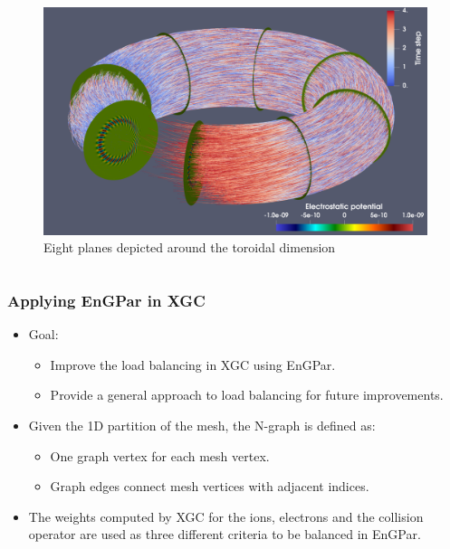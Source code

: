 \documentclass[aspectratio=169]{beamer}
\begin{document}
\begin{frame}
\begin{columns}
\begin{column}{.3\textwidth}
      \begin{figure}
        \centering
        \includegraphics[height=.3\textheight]{cyclone_590k_30kptcls.png}
        \caption*{Eight planes depicted around the toroidal dimension}
      \end{figure}
    \end{column}
  \end{columns}
\end{frame}

\begin{frame}
  \frametitle{Applying EnGPar in XGC}
  \begin{itemize}
  \item Goal:
    \begin{itemize}
    \item Improve the load balancing in XGC using EnGPar.
    \item Provide a general approach to load balancing for future improvements.
    \end{itemize}
  \item Given the 1D partition of the mesh, the N-graph is defined as:
    \begin{itemize}
    \item One graph vertex for each mesh vertex.
    \item Graph edges connect mesh vertices with adjacent indices.
    \end{itemize}
  \item The weights computed by XGC for the ions, electrons and the collision operator are used as three different criteria to be balanced in EnGPar.
  \end{itemize}
\end{frame}
\end{document}
